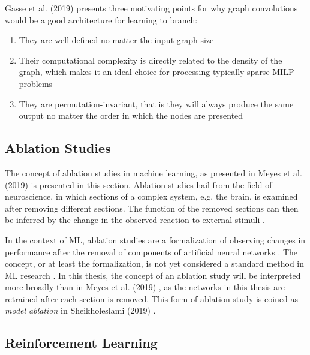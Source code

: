Gasse et al. (2019) \cite{gasse2019exact} presents three motivating points for why graph convolutions would be a good architecture for learning to branch:
\begin{enumerate}[label=(\roman*)]
    \item They are well-defined no matter the input graph size
    \item Their computational complexity is directly related
to the density of the graph, which makes it an ideal choice for processing typically sparse \gls{MILP}
problems
    \item They are permutation-invariant, that is they will always produce the same output no
matter the order in which the nodes are presented
\end{enumerate}






\subsection{Ablation Studies}

The concept of ablation studies in machine learning, as presented in 
Meyes et al. (2019) \cite{meyes2019ablation} is presented in this section.
Ablation studies hail from the field of neuroscience, in which sections of a complex system, e.g. the brain, is examined after removing different sections. The function of the removed sections can then be inferred by the change in the observed reaction to external stimuli \cite{meyes2019ablation}.

In the context of \gls{ML}, ablation studies are a formalization of observing changes in performance after the removal of components of artificial neural networks \cite{meyes2019ablation}.  
The concept, or at least the formalization, is not yet considered a standard method in \gls{ML} research \cite{sheikholeslami2019ablation}.
In this thesis, the concept of an ablation study will be interpreted more broadly than in Meyes et al. (2019) \cite{meyes2019ablation}, as the networks in this thesis are retrained after each section is removed. This form of ablation study is coined as \textit{model ablation} in Sheikholeslami (2019) \cite{sheikholeslami2019ablation}.





\subsection{Reinforcement Learning}

